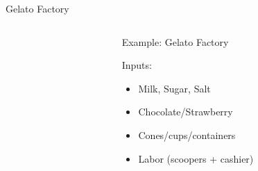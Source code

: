 \documentclass[notes,11pt, aspectratio=169, xcolor=table]{beamer}
\newenvironment{wideitemize}{\itemize\addtolength{\itemsep}{10pt}}{\enditemize}
\begin{document}
\begin{frame}{Gelato Factory}

\begin{columns}[T] %
\begin{column}{.4\textwidth}
\end{column}%
\hfill%
\begin{column}{.6\textwidth}
  \begin{wideitemize}
    \item Example: Gelato Factory
    \item Inputs:
    \begin{itemize}
        \item Milk, Sugar, Salt
        \item Chocolate/Strawberry
        \item Cones/cups/containers
        \item Labor (scoopers + cashier)

\end{itemize}
\end{wideitemize}
\end{column}
\end{columns}
\end{frame}
\end{document}
